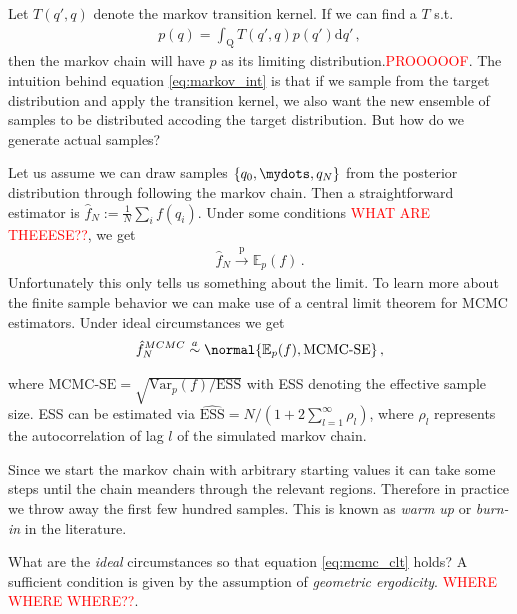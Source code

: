 Let $T(q', q)$ denote the markov transition kernel. If we can find a $T$ s.t.
\begin{align}
  p(q) = \int_{\mathrm{Q}} T(q', q) p(q') \mathrm{d}q' \,,
  \label{eq:markov_int}
\end{align}
then the markov chain will have $p$ as its limiting distribution.\textcolor{red}{PROOOOOF}.
The intuition behind equation \ref{eq:markov_int} is that if we sample from the
target distribution and apply the transition kernel, we also want the new ensemble of
samples to be distributed accoding the target distribution. But how do we generate
actual samples?


Let us assume we can draw samples $\{q_0, \mydots, q_N\}$ from the posterior distribution through following
the markov chain. Then a straightforward estimator is $\hat{f}_N := \frac{1}{N} \sum_i f(q_i)$.
Under some conditions \textcolor{red}{WHAT ARE THEEESE??}, we get
\begin{align}
  \hat{f}_N \overset{\mathrm{p}}{\longrightarrow} \mathbb{E}_p(f) \,.
\end{align}
Unfortunately this only tells us something about the limit. To learn more about the
finite sample behavior we can make use of a central limit theorem for MCMC estimators.
Under ideal circumstances we get
\begin{align}
  \hat{f}_N^{MCMC} \overset{a}{\sim} \normal{\mathbb{E}_p(f), \text{MCMC-SE}} \,,
  \label{eq:mcmc_clt}
\end{align}

where $\text{MCMC-SE} = \sqrt{\text{Var}_p(f) / \text{ESS}}$ with ESS denoting the effective sample size.
ESS can be estimated via $\hat{\text{ESS}} = N / (1 + 2 \sum_{l=1}^\infty \rho_l)$, where $\rho_l$ represents
the autocorrelation of lag $l$ of the simulated markov chain.

Since we start the markov chain with arbitrary starting values it can take some
steps until the chain meanders through the relevant regions. Therefore in practice
we throw away the first few hundred samples. This is known as \emph{warm up} or
\emph{burn-in} in the literature.

What are the \emph{ideal} circumstances so that equation \ref{eq:mcmc_clt} holds?
A sufficient condition is given by the assumption of \emph{geometric ergodicity}.
\textcolor{red}{WHERE WHERE WHERE??}.

